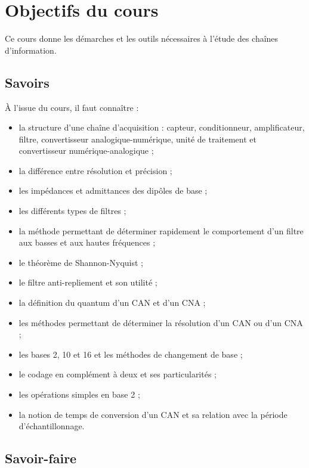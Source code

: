 
\section*{Objectifs du cours}

Ce cours donne les démarches et les outils nécessaires à l'étude des chaînes d'information.

\subsection*{Savoirs}

À l'issue du cours, il faut connaître :
\begin{itemize}
  \item la structure d'une chaîne d'acquisition : capteur, conditionneur, amplificateur, filtre, convertisseur analogique-numérique, unité de traitement et convertisseur numérique-analogique ;
  \item la différence entre résolution et précision ;
  \item les impédances et admittances des dipôles de base ;
  \item les différents types de filtres ;
  \item la méthode permettant de déterminer rapidement le comportement d'un filtre aux basses et aux hautes fréquences ;
  \item le théorème de Shannon-Nyquist ;
  \item le filtre anti-repliement et son utilité ;
  \item la définition du quantum d'un CAN et d'un CNA ;
  \item les méthodes permettant de déterminer la résolution d'un CAN ou d'un CNA ;
  \item les bases 2, 10 et 16 et les méthodes de changement de base ;
  \item le codage en complément à deux et ses particularités ;
  \item les opérations simples en base 2 ;
  \item la notion de temps de conversion d'un CAN et sa relation avec la période d'échantillonnage.
\end{itemize}

\subsection*{Savoir-faire}

